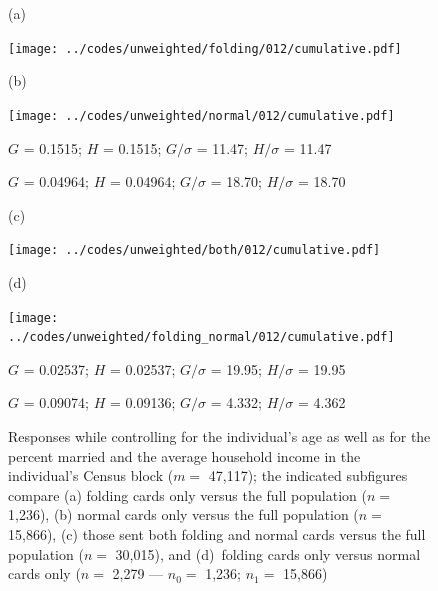\documentclass{article}
\newlength{\vertsep}
\newlength{\imsize}
\newlength{\imsized}
\begin{document}
\begin{figure}
\begin{centering}

(a) \parbox{\imsize}{\texttt{[image: ../codes/unweighted/folding/012/cumulative.pdf]}}
\quad\quad
(b) \parbox{\imsize}{\texttt{[image: ../codes/unweighted/normal/012/cumulative.pdf]}}

\parbox{\imsized}{\hfil \footnotesize $G$ = 0.1515; $H$ = 0.1515;
$G/\sigma$ = 11.47; $H/\sigma$ = 11.47}
\parbox{\imsized}{\hfil \footnotesize $G$ = 0.04964; $H$ = 0.04964;
$G/\sigma$ = 18.70; $H/\sigma$ = 18.70}

\vspace{\vertsep}

(c) \parbox{\imsize}{\texttt{[image: ../codes/unweighted/both/012/cumulative.pdf]}}
\quad\quad
(d) \parbox{\imsize}{\texttt{[image: ../codes/unweighted/folding\_normal/012/cumulative.pdf]}}

\parbox{\imsized}{\hfil \footnotesize $G$ = 0.02537; $H$ = 0.02537;
$G/\sigma$ = 19.95; $H/\sigma$ = 19.95}
\parbox{\imsized}{\hfil \footnotesize $G$ = 0.09074; $H$ = 0.09136;
$G/\sigma$ = 4.332; $H/\sigma$ = 4.362}

\end{centering}
\caption{Responses while controlling for the individual's age as well as
for the percent married and the average household income
in the individual's Census block ($m =$ 47,117);
the indicated subfigures compare
(a) folding cards only versus the full population ($n =$ 1,236),
(b) normal cards only versus the full population ($n =$ 15,866),
(c) those sent both folding and normal cards versus the full population
($n =$ 30,015), and (d)~folding cards only versus normal cards only
($n =$ 2,279 --- $n_0 =$ 1,236; $n_1 =$ 15,866)}
\label{allcovariates}
\end{figure}
\end{document}
